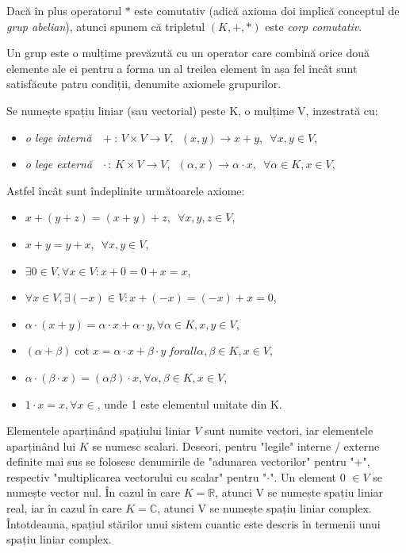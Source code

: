 Dacă în plus operatorul $*$ este comutativ (adică axioma doi implică conceptul de \textit{grup abelian}), atunci spunem că tripletul $(K, +, *)$ este \textit{corp comutativ}.

Un grup este o mulțime prevăzută cu un operator care combină orice două elemente ale ei pentru a forma un al treilea element în așa fel încât sunt satisfăcute patru condiții, denumite axiomele grupurilor.

Se numește spațiu liniar (sau vectorial) peste K, o mulțime V, inzestrată cu:
\begin{itemize}
    \item \textit{o lege internă} $\enspace+$: \enspace$V \times V \rightarrow V,\enspace (x, y) \rightarrow x + y,\enspace \forall x,y \in V$,
    \item \textit{o lege externă} $\enspace\cdot$: $K \times V \rightarrow V, \enspace (\alpha, x) \rightarrow \alpha \cdot x, \enspace \forall \alpha \in K, x \in V$, 
\end{itemize}

Astfel încât sunt îndeplinite următoarele axiome:

\begin{itemize}
    \item $x + (y + z) = (x + y) + z,  \enspace \forall x,y,z \in V$,
    \item $x + y = y + x, \enspace \forall x, y \in V$,
    \item $\exists0 \in V, \forall x \in V: x + 0 = 0 + x = x$,
    \item $\forall x \in V, \exists (-x) \in V: x + (-x) = (-x) + x = 0$,
    \item $\alpha \cdot (x+y) = \alpha \cdot x + \alpha \cdot y, \forall \alpha \in K, x,y \in V$,
    \item $(\alpha + \beta)\cot x = \alpha \cdot x + \beta \cdot y\ forall \alpha, \beta \in K, x \in V$,
    \item $\alpha \cdot (\beta \cdot x) = (\alpha \beta ) \cdot x, \forall \alpha, \beta \in K, x \in V$,
    \item $1 \cdot x = x, \forall x \in $, unde 1 este elementul unitate din K.
\end{itemize}

Elementele aparținând spațiului liniar $V$ sunt numite vectori, iar elementele aparținând lui $K$ se numesc scalari. Deseori, pentru "legile" interne / externe definite mai sus se folosesc denumirile de "adunarea vectorilor" pentru "+", respectiv "multiplicarea vectorului cu scalar" pentru "$\cdot$". Un element 0 $\in V$ se numește vector nul. În cazul în care $K = \mathbb{R}$, atunci V se numește spațiu liniar real, iar în cazul în care $K = \mathbb{C}$, atunci V se numește spațiu liniar complex. 
Întotdeauna, spațiul stărilor unui sistem cuantic este descris în termenii unui spațiu liniar complex.

